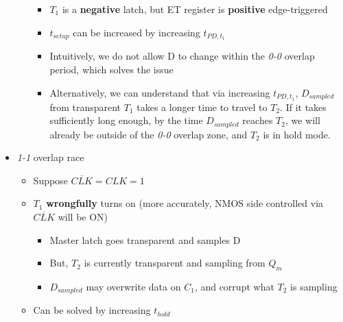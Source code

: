 \documentclass{article}
\begin{document}
\begin{itemize}
\begin{itemize}
            \begin{itemize}
                \item $T_{1}$ is a \textbf{negative} latch, but ET register is \textbf{positive} edge-triggered
                \item $t_{setup}$ can be increased by increasing $t_{PD,t_{1}}$
                \item Intuitively, we do not allow D to change within the \textit{0-0} overlap period, which solves the issue
                \item Alternatively, we can understand that via increasing $t_{PD,t_{1}}$, $D_{sampled}$ from transparent $T_{1}$ takes a longer time to travel to $T_{2}$.
                        If it takes sufficiently long enough, by the time $D_{sampled}$ reaches $T_{2}$, we will already be outside of the \textit{0-0} overlap zone, and $T_{2}$ is in hold mode.
            \end{itemize}
        \end{itemize}
    \item \textit{1-1} overlap race
        \begin{itemize}
            \item Suppose $\overline{CLK} = CLK = 1$
            \item $T_{1}$ \textbf{wrongfully} turns on (more accurately, NMOS side controlled via $\overline{CLK}$ will be ON)
                \begin{itemize}
                    \item Master latch goes transparent and samples D
                    \item But, $T_{2}$ is currently transparent and sampling from $Q_{m}$
                    \item $D_{sampled}$ may overwrite data on $C_{1}$, and corrupt what $T_{2}$ is sampling
                \end{itemize}

            \vspace{0.5cm}
            \item Can be solved by increasing $t_{hold}$
            

\end{itemize}
\end{itemize}
\end{document}
